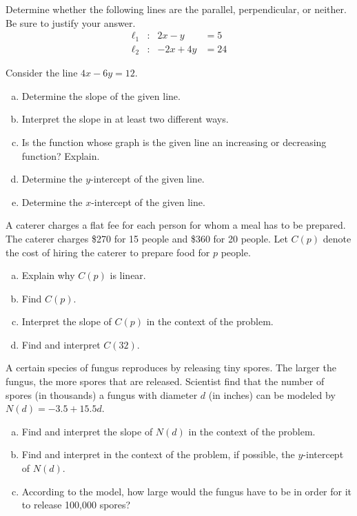 \documentclass[12pt,letterpaper]{exam}
\begin{document}
\begin{questions}
\newpage
\question[10] Determine whether the following lines are the parallel, perpendicular, or neither. Be sure to justify your answer. 
	\[
	\begin{aligned}
	\ell_1 &\colon & 2x - y&= 5 \\[0.3cm]
	\ell_2 &\colon & -2x + 4y&= 24
	\end{aligned}
	\] 



\newpage
\question[10] Consider the line $4x - 6y= 12$.
	\begin{enumerate}[(a)]
	\item Determine the slope of the given line.
	\item Interpret the slope in at least two different ways.
	\item Is the function whose graph is the given line an increasing or decreasing function? Explain. 
	\item Determine the $y$-intercept of the given line. 
	\item Determine the $x$-intercept of the given line. 
	\end{enumerate}



\newpage
\question[10] A caterer charges a flat fee for each person for whom a meal has to be prepared. The caterer charges \$270 for 15 people and \$360 for 20 people. Let $C(p)$ denote the cost of hiring the caterer to prepare food for $p$ people. 
	\begin{enumerate}[(a)]
	\item Explain why $C(p)$ is linear.
	\item Find $C(p)$.
	\item Interpret the slope of $C(p)$ in the context of the problem. 
	\item Find and interpret $C(32)$. 
	\end{enumerate}



\newpage
\question[10] A certain species of fungus reproduces by releasing tiny spores. The larger the fungus, the more spores that are released. Scientist find that the number of spores (in thousands) a fungus with diameter $d$ (in inches) can be modeled by $N(d)= -3.5 + 15.5d$.
	\begin{enumerate}[(a)]
	\item Find and interpret the slope of $N(d)$ in the context of the problem.
	\item Find and interpret in the context of the problem, if possible, the $y$-intercept of $N(d)$.
	\item According to the model, how large would the fungus have to be in order for it to release 100,000 spores?
	\end{enumerate}




\end{questions}
\end{document}
